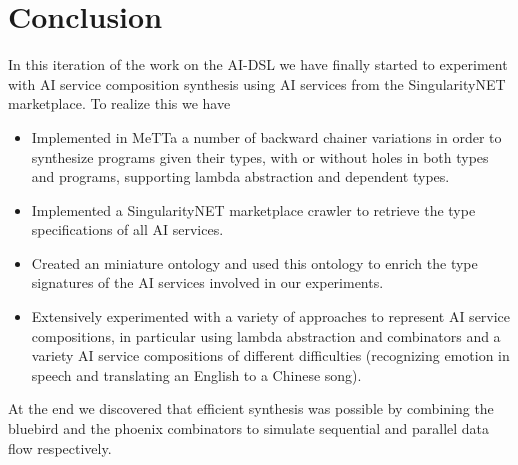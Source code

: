\documentclass[]{report}
\begin{document}
\chapter{Conclusion}
In this iteration of the work on the AI-DSL we have finally started to
experiment with AI service composition synthesis using AI services
from the SingularityNET marketplace.  To realize this we have
\begin{itemize}
\item Implemented in MeTTa a number of backward chainer variations in
  order to synthesize programs given their types, with or without
  holes in both types and programs, supporting lambda abstraction and
  dependent types.
\item Implemented a SingularityNET marketplace crawler to retrieve the
  type specifications of all AI services.
\item Created an miniature ontology and used this ontology to enrich
  the type signatures of the AI services involved in our experiments.
\item Extensively experimented with a variety of approaches to
  represent AI service compositions, in particular using lambda
  abstraction and combinators and a variety AI service compositions of
  different difficulties (recognizing emotion in speech and
  translating an English to a Chinese song).
\end{itemize}
At the end we discovered that efficient synthesis was possible by
combining the bluebird and the phoenix combinators to simulate
sequential and parallel data flow respectively.
\end{document}
